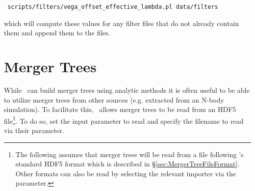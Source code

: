 \begin{verbatim}
 scripts/filters/vega_offset_effective_lambda.pl data/filters
\end{verbatim}
which will compute these values for any filter files that do not already contain them and append them to the files.

\section{Merger Trees}\label{sec:MergerTreeFiles}

While \glc\ can build merger trees using analytic methods it is often useful to be able to utilize merger trees from other sources (e.g. extracted from an N-body simulation). To facilitate this, \glc\ allows merger trees to be read from an HDF5 file\footnote{The following assumes that merger trees will be read from a file following \protect\glc's standard HDF5 format which is described in \S\protect\ref{sec:MergerTreeFileFormat}. Other formats can also be read by selecting the relevant importer via the {\normalfont \ttfamily [mergerTreeImporterMethod]} parameter.}. To do so, set the {\normalfont \ttfamily [mergerTreeConstructMethod]} input parameter to {\normalfont \ttfamily read} and specify the filename to read via their {\normalfont \ttfamily [mergerTreeReadFileName]} parameter.

